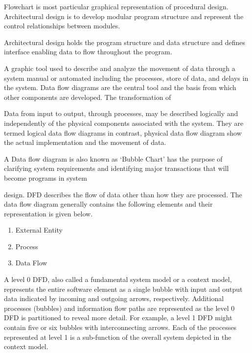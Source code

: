 \documentclass{article} %
\begin{document}
\noindent           Flowchart is most particular graphical representation of procedural design. Architectural design is to develop modular program structure and represent the control relationships between modules. 

\noindent          Architectural design holds the program structure and data structure and defines interface enabling data to flow throughout the program.

\noindent 

\noindent \textbf{\underbar{}}

\noindent \textbf{\underbar{\eject }}

\noindent \textbf{}\underbar{}

\noindent A graphic tool used to describe and analyze the movement of data through a system manual or automated including the processes, store of data, and delays in the system. Data flow diagrams are the central tool and the basis from which other components are developed. The transformation of 

\noindent 

\noindent Data from input to output, through processes, may be described logically and independently of the physical components associated with the system. They are termed logical data flow diagrams in contrast, physical data flow diagram show the actual implementation and the movement of data. 

\noindent               A Data flow diagram is also known as `Bubble Chart' has the purpose of clarifying system requirements and identifying major transactions that will become programs in system 

\noindent              design. DFD describes the flow of data other than how they are processed. The data flow diagram generally contains the following elements and their representation is given below. 

\begin{enumerate}
\item  External Entity 

\item  Process 

\item  Data Flow 
\end{enumerate}

\noindent 

\noindent A level 0 DFD, also called a fundamental system model or a context model, represents the entire software element as a single bubble with input and output data indicated by incoming and outgoing arrows, respectively. Additional processes (bubbles) and information flow paths are represented as the level 0 DFD is partitioned to reveal more detail. For example, a level 1 DFD might contain five or six bubbles with interconnecting arrows. Each of the processes represented at level 1 is a sub-function of the overall system depicted in the context model. 
\end{document}
